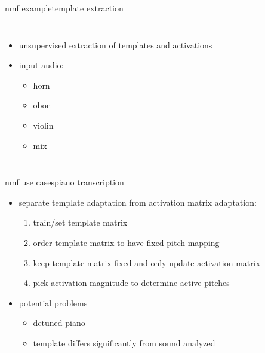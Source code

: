         \begin{frame}{nmf example}{template extraction}
            \vspace{-3mm}
            \begin{columns}
                    \begin{itemize}
                        \item   unsupervised extraction of templates and activations
                        \item   input audio: 
                            \begin{itemize}
                                \item  {} horn
                                \item  {} oboe
                                \item  {} violin
                                \item  {} mix
                            \end{itemize}
                    \end{itemize}
            \end{columns}
        \end{frame}
        
        \begin{frame}{nmf use cases}{piano transcription}
            \begin{itemize}
                \item   separate template adaptation from activation matrix adaptation:
                    \begin{enumerate}
                        \item  train/set template matrix
                        \item  order template matrix to have fixed pitch mapping
                        \item  keep template matrix fixed and only update activation matrix
                        \item  pick activation magnitude to determine active pitches
                    \end{enumerate}
                \bigskip
                \item   potential problems
                    \begin{itemize}
                        \item   detuned piano
                        \item   template differs significantly from sound analyzed
                    \end{itemize}
            \end{itemize}
        \end{frame}
        
